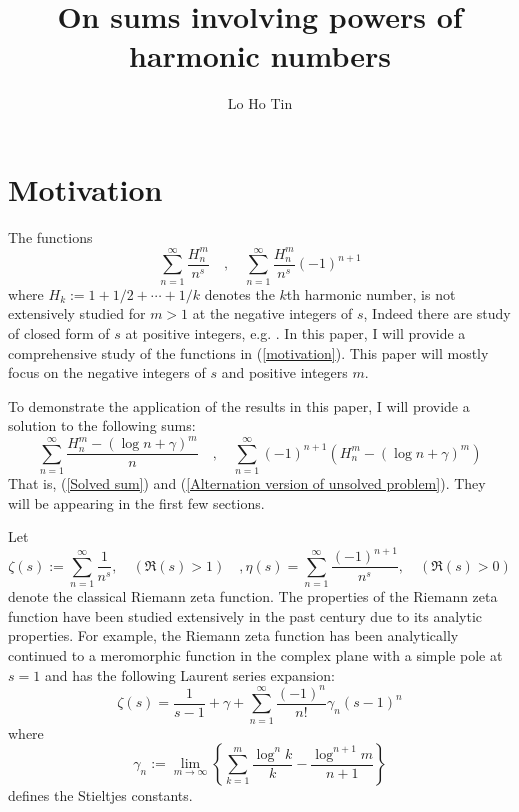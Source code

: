 \documentclass{article}
\author[1]{Lo Ho Tin}
\begin{document}
\title{On sums involving powers of harmonic numbers}
\maketitle



\section{Motivation}
The functions \begin{equation}\label{motivation}\sum_{n=1}^{\infty}\frac{H_n^{m}}{n^s}\quad ,\quad \sum_{n=1}^{\infty}\frac{H_n^{m}}{n^s}(-1)^{n+1}\end{equation}
where $H_k := 1 + 1/2 + \cdots + 1/k$ denotes the $k$th harmonic number, is not extensively studied for $m>1$ at the negative integers of $s$, Indeed there are study of closed form of $s$ at positive integers, e.g. \cite{bailey1994experimental}. In this paper, I will provide a comprehensive study of the functions in (\ref{motivation}). This paper will mostly focus on the negative integers of $s$ and positive integers $m$. 
\par
To demonstrate the application of the results in this paper, I will provide a solution to the following sums:
$$\sum_{n=1}^{\infty}\frac{H_n^m-(\log n+\gamma)^m}{n} \quad ,\quad \sum_{n=1}^{\infty}(-1)^{n+1}\left(H_n^m-(\log n+\gamma)^m\right)$$ That is, (\ref{Solved sum}) and (\ref{Alternation version of unsolved problem}). They will be appearing in the first few sections.
\par Let
$$\zeta(s) := \sum_{n=1}^\infty \frac{1}{n^s}, \quad (\Re(s) > 1) \quad ,\eta(s)=\sum_{n=1}^{\infty}\frac{(-1)^{n+1}}{n^s},\quad (\Re(s)>0)$$
denote the classical Riemann zeta function. The properties of the Riemann zeta function have been studied extensively in the past century due to its analytic properties. For example, the Riemann zeta function has been analytically continued to a meromorphic function in the complex plane with a simple pole at $s = 1$ and has the following Laurent series expansion:
\begin{equation}\label{Laurent of zeta}
    \zeta(s)=\frac{1}{s-1}+\gamma+\sum_{n=1}^{\infty} \frac{(-1)^n}{n!}\gamma_n (s-1)^n
\end{equation}
where $$\gamma_n := \lim_{m \to \infty} \left\{\sum_{k=1}^m \frac{\log^n k}{k} - \frac{\log^{n+1} m}{n+1}\right\}$$ defines the Stieltjes constants.
\end{document}
